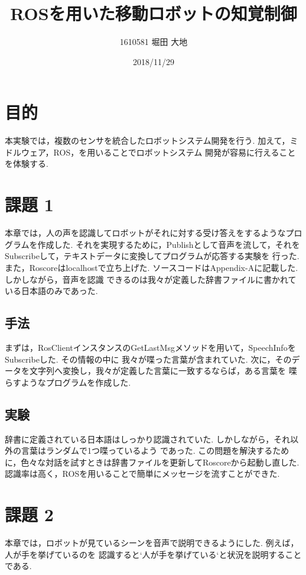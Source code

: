 \documentclass[10pt,a4j]{jsarticle}
\title{\vspace{-2.5cm}ROSを用いた移動ロボットの知覚制御}
\author{1610581 堀田 大地}
\date{2018/11/29}
\begin{document}
\maketitle{}
\thispagestyle{empty}
\clearpage


\section{目的}
  本実験では，複数のセンサを統合したロボットシステム開発を行う. 加えて，ミドルウェア，ROS，を用いることでロボットシステム
  開発が容易に行えることを体験する.

\section{課題 1}
本章では，人の声を認識してロボットがそれに対する受け答えをするようなプログラムを作成した.
それを実現するために，Publishとして音声を流して，それをSubscribeして，テキストデータに変換してプログラムが応答する実験を
行った. また，Roscoreはlocalhostで立ち上げた. ソースコードはAppendix-Aに記載した. しかしながら，音声を認識
できるのは我々が定義した辞書ファイルに書かれている日本語のみであった.

  \subsection{手法}
  まずは，RosClientインスタンスのGetLastMsgメソッドを用いて，SpeechInfoをSubscribeした. その情報の中に
  我々が喋った言葉が含まれていた. 次に，そのデータを文字列へ変換し，我々が定義した言葉に一致するならば，ある言葉を
  喋らすようなプログラムを作成した.

  \subsection{実験}
  辞書に定義されている日本語はしっかり認識されていた. しかしながら，それ以外の言葉はランダムで1つ喋っているよう
  であった. この問題を解決するために，色々な対話を試すときは辞書ファイルを更新してRoscoreから起動し直した.
  認識率は高く，ROSを用いることで簡単にメッセージを流すことができた.

\section{課題 2}
本章では，ロボットが見ているシーンを音声で説明できるようにした. 例えば，人が手を挙げているのを
認識すると`人が手を挙げている`と状況を説明することである. 
  
\end{document}

